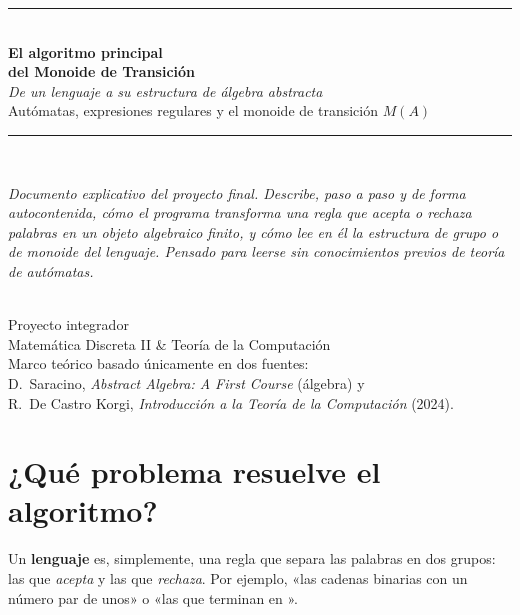 \documentclass[11pt,a4paper]{article}
\theoremstyle{acc}
\newcommand{\code}[1]{{\ttfamily #1}}
\begin{document}
\begin{titlepage}
\centering
\vspace*{1.6cm}
{\color{accent}\rule{\linewidth}{1.4pt}}\\[1.1cm]
{\sffamily\bfseries\color{accent}\Huge El algoritmo principal\\[0.35cm]
 del Monoide de Transición}\\[0.7cm]
{\Large\itshape De un lenguaje a su estructura de álgebra abstracta}\\[0.5cm]
{\large Autómatas, expresiones regulares y el monoide de transición $M(A)$}\\[1.0cm]
{\color{accent}\rule{\linewidth}{1.4pt}}\\[1.4cm]

\begin{minipage}{0.85\linewidth}\centering\itshape\color{ink}
Documento explicativo del proyecto final. Describe, paso a paso y de forma
autocontenida, cómo el programa transforma una regla que acepta o rechaza
palabras en un objeto algebraico finito, y cómo lee en él la estructura de grupo
o de monoide del lenguaje. Pensado para leerse sin conocimientos previos de
teoría de autómatas.
\end{minipage}\\[1.6cm]

{\large\sffamily Proyecto integrador}\\[0.2cm]
{\sffamily\color{accent2}Matemática Discreta II \; \& \; Teoría de la Computación}\\[0.8cm]
{\small Marco teórico basado únicamente en dos fuentes:\\
D.~Saracino, \textit{Abstract Algebra: A First Course}\; (álgebra) \; y\\
R.~De Castro Korgi, \textit{Introducción a la Teoría de la Computación}\; (2024).}
\vfill
\end{titlepage}

\tableofcontents
\thispagestyle{fancy}
\vspace{1em}

\section{¿Qué problema resuelve el algoritmo?}

Un \textbf{lenguaje} es, simplemente, una regla que separa las palabras en dos
grupos: las que \emph{acepta} y las que \emph{rechaza}. Por ejemplo, «las cadenas
binarias con un número par de unos» o «las que terminan en \code{01}».
\end{document}
